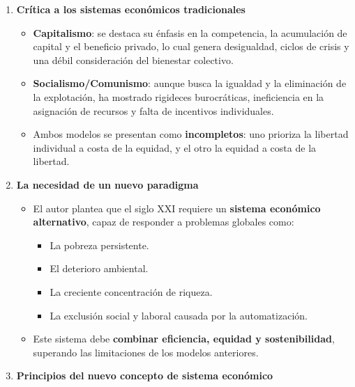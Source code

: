 \documentclass[12pt]{book} %
\providecommand{\tightlist}{%
  \setlength{\itemsep}{0pt}\setlength{\parskip}{0pt}}
\begin{document}
\begin{enumerate}
\def\labelenumi{\arabic{enumi}.}
\item
  \textbf{Crítica a los sistemas económicos tradicionales}

  \begin{itemize}
  \tightlist
  \item
    \textbf{Capitalismo}: se destaca su énfasis en la competencia, la
    acumulación de capital y el beneficio privado, lo cual genera
    desigualdad, ciclos de crisis y una débil consideración del
    bienestar colectivo.
  \item
    \textbf{Socialismo/Comunismo}: aunque busca la igualdad y la
    eliminación de la explotación, ha mostrado rigideces burocráticas,
    ineficiencia en la asignación de recursos y falta de incentivos
    individuales.
  \item
    Ambos modelos se presentan como \textbf{incompletos}: uno prioriza
    la libertad individual a costa de la equidad, y el otro la equidad a
    costa de la libertad.
  \end{itemize}
\item
  \textbf{La necesidad de un nuevo paradigma}

  \begin{itemize}
  \tightlist
  \item
    El autor plantea que el siglo XXI requiere un \textbf{sistema
    económico alternativo}, capaz de responder a problemas globales
    como:

    \begin{itemize}
    \tightlist
    \item
      La pobreza persistente.
    \item
      El deterioro ambiental.
    \item
      La creciente concentración de riqueza.
    \item
      La exclusión social y laboral causada por la automatización.
    \end{itemize}
  \item
    Este sistema debe \textbf{combinar eficiencia, equidad y
    sostenibilidad}, superando las limitaciones de los modelos
    anteriores.
  \end{itemize}
\item
  \textbf{Principios del nuevo concepto de sistema económico}


\end{enumerate}
\end{document}
